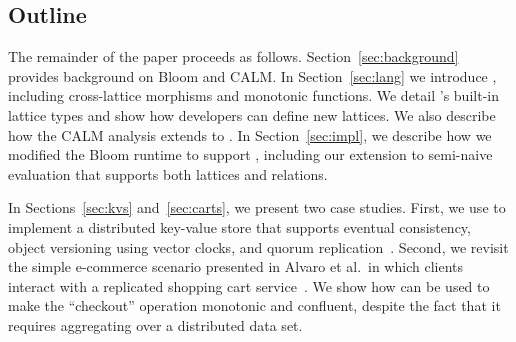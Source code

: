\subsection{Outline}
The remainder of the paper proceeds as follows.  Section~\ref{sec:background}
provides background on Bloom and CALM.  In Section~\ref{sec:lang} we introduce
\lang, including cross-lattice morphisms and monotonic functions. We detail
\lang's built-in lattice types and show how developers can define new lattices.
We also describe how the CALM analysis extends to \lang.  In
Section~\ref{sec:impl}, we describe how we modified the Bloom runtime to support
\lang, including our extension to semi-naive evaluation that supports both
lattices and relations.

In Sections~\ref{sec:kvs} and~\ref{sec:carts}, we present two case studies.
First, we use \lang to implement a distributed key-value store that supports
eventual consistency, object versioning using vector clocks, and quorum
replication~\cite{Gifford1979}. Second, we revisit the simple e-commerce
scenario presented in Alvaro et al.\ in which clients interact with a replicated
shopping cart service~\cite{Alvaro2011}. We show how \lang can be used to make
the ``checkout'' operation monotonic and confluent, despite the fact that it
requires aggregating over a distributed data set.

